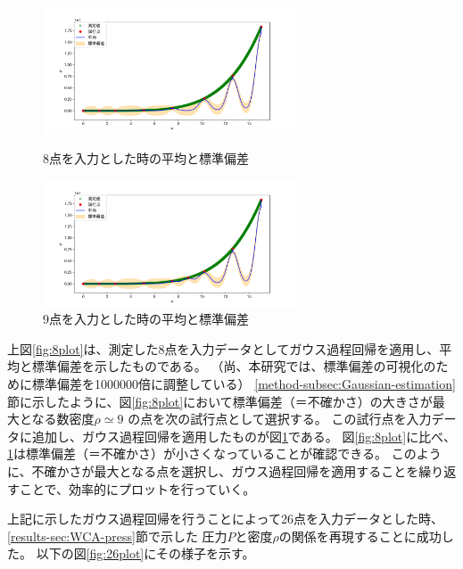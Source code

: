\documentclass[titlepage]{jsreport}
\begin{document}
{{{\begin{figure}[htbp]
    \begin{minipage}{0.5\hsize}
    \begin{center}
     \includegraphics[width=75mm]{fig/8plot-Gauss.png}
     \caption{8点を入力とした時の平均と標準偏差}
     \label{fig:8plot}
    \end{center}
    \end{minipage}
    \begin{minipage}{0.5\hsize}
    \begin{center}
     \includegraphics[width=75mm]{fig/9plot-Gauss.png}
     \caption{9点を入力とした時の平均と標準偏差}
     \label{fig:9plot}
    \end{center}
    \end{minipage}
   \end{figure}

上図\ref{fig:8plot}は、測定した8点を入力データとしてガウス過程回帰を適用し、平均と標準偏差を示したものである。
（尚、本研究では、標準偏差の可視化のために標準偏差を1000000倍に調整している）
\ref{method-subsec:Gaussian-estimation}節に示したように、図\ref{fig:8plot}において標準偏差（＝不確かさ）の大きさが最大となる数密度${\rho}\simeq9$
の点を次の試行点として選択する。
この試行点を入力データに追加し、ガウス過程回帰を適用したものが図\ref{fig:9plot}である。
図\ref{fig:8plot}に比べ、\ref{fig:9plot}は標準偏差（＝不確かさ）が小さくなっていることが確認できる。
このように、不確かさが最大となる点を選択し、ガウス過程回帰を適用することを繰り返すことで、効率的にプロットを行っていく。

上記に示したガウス過程回帰を行うことによって26点を入力データとした時、\ref{results-sec:WCA-press}節で示した
圧力$P$と密度$\rho$の関係を再現することに成功した。
以下の図\ref{fig:26plot}にその様子を示す。

}}}
\end{document}
